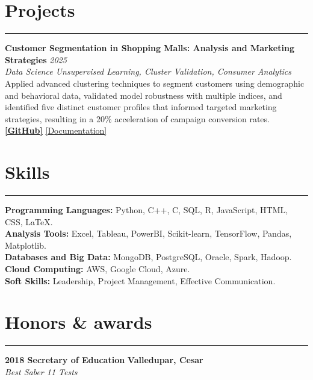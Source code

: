 \documentclass[9pt,a4paper]{article}
\newcommand{\cvevent}[4]{%
  {\noindent \textbf{#1 #2} \hfill \textbf{#3}\\%
   \textit{#4}\\[0pt]}%
}
\begin{document}
\section*{Projects}
\vspace{-\baselineskip}
\noindent\rule{\linewidth}{0.5pt}

\textbf{Customer Segmentation in Shopping Malls: Analysis and Marketing Strategies} \hfill \textit{2025} \\
\textit{Data Science \textbar{} Unsupervised Learning, Cluster Validation, Consumer Analytics} \\
Applied advanced clustering techniques to segment customers using demographic and behavioral data, validated model robustness with multiple indices, and identified five distinct customer profiles that informed targeted marketing strategies, resulting in a 20\% acceleration of campaign conversion rates. \\
\textbf{\href{https://github.com/Ares-Infenus/Customer-Segmentation-in-Shopping-Malls}{[GitHub]}} \textbar{} \href{https://drive.google.com/file/d/1wPNeTWYn17Iix7GtWFPAcKPULzoskr_N/view?usp=sharing}{[Documentation]}

\vspace{-\baselineskip}
\section*{Skills}
\vspace{-\baselineskip}
\noindent\rule{\linewidth}{0.5pt}

\textbf{Programming Languages:} Python, C++, C, SQL, R, JavaScript, HTML, CSS, LaTeX.\\
\textbf{Analysis Tools:} Excel, Tableau, PowerBI, Scikit-learn, TensorFlow, Pandas, Matplotlib.\\
\textbf{Databases and Big Data:} MongoDB, PostgreSQL, Oracle, Spark, Hadoop.\\
\textbf{Cloud Computing:} AWS, Google Cloud, Azure.\\
\textbf{Soft Skills:} Leadership, Project Management, Effective Communication.
\vspace{-\baselineskip}
\section*{Honors \& awards}
\vspace{-\baselineskip}
\noindent\rule{\linewidth}{0.5pt}

\cvevent{2018}{Secretary of Education}{Valledupar, Cesar}{Best Saber 11 Tests}
\vspace{-\baselineskip}
\vspace{-\baselineskip}
\end{document}
